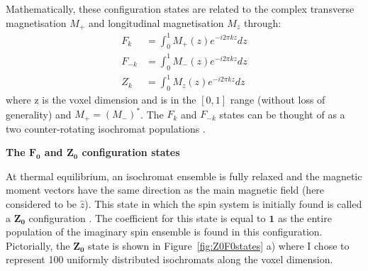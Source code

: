 \hfill

Mathematically, these configuration states are related to
the complex transverse magnetisation $M_{+}$ and longitudinal magnetisation $M_z$ \cite{Hennig1991} through:
\begin{equation}
\begin{split}
    F_{k}  & = \int_0^1 M_{+}(z) e^{- i 2\pi k z} dz \\ %
    F_{-k} & = \int_0^1 M_{-}(z) e^{- i 2\pi k z} dz \\ %
    Z_{k} & = \int_0^1 M_{z}(z) e^{- i 2\pi k z} dz %
\end{split}    
\end{equation}
where z is the voxel dimension and is in the $[0,1]$ range (without loss of generality) and $M_+ = (M_-)^*$.
The $F_{k}$ and $F_{-k}$ states can be thought of as a two counter-rotating isochromat populations \cite{Brown}.

\hfill

\textbf{The $\bm{F_0}$ and $\bm{Z_0}$ configuration states}

At thermal equilibrium, an isochromat ensemble is fully relaxed and the magnetic moment vectors have the same direction as the main magnetic field (here considered to be $\hat{z}$).
This state in which the spin system is initially found is called a $\bm{Z_0}$ configuration \cite{Weigel2015} \cite{Scheffler1999} \cite{Hennig1991}.
The coefficient for this state is equal to $\bm{1}$ as the entire population of the imaginary spin ensemble is found in this configuration.
Pictorially, the $\bm{Z_0}$ state is shown in Figure~\ref{fig:Z0F0states} a) where I chose to represent 100 uniformly distributed isochromats along the voxel dimension.


